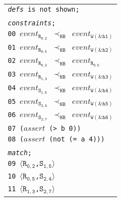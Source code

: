 \newsavebox{\boxSMTb}
\begin{lrbox}{\boxSMTb}
\normalsize
\begin{tabular}[c]{l}
\texttt{\textit{defs} is not shown;}\\
\\
\texttt{\textit{constraints};}\\
\texttt{00 $\mathit{event_\mathtt{R_{0,2}}}$ $\mathtt{\prec_\mathtt{HB}}$ $\mathit{event_\mathtt{W(\&h1)}}$}\\
\texttt{01 $\mathit{event_\mathtt{R_{0,5}}}$ $\mathtt{\prec_\mathtt{HB}}$ $\mathit{event_\mathtt{W(\&h2)}}$}\\
\texttt{02 $\mathit{event_\mathtt{R_{0,2}}}$ $\mathtt{\prec_\mathtt{HB}}$ $\mathit{event_\mathtt{R_{0,5}}}$}\\
\texttt{03 $\mathit{event_\mathtt{R_{1,3}}}$ $\mathtt{\prec_\mathtt{HB}}$ $\mathit{event_\mathtt{W(\&h3)}}$}\\
\texttt{04 $\mathit{event_\mathtt{S_{1,5}}}$ $\mathtt{\prec_\mathtt{HB}}$ $\mathit{event_\mathtt{W(\&h4)}}$}\\
\texttt{05 $\mathit{event_\mathtt{S_{2,4}}}$ $\mathtt{\prec_\mathtt{HB}}$ $\mathit{event_\mathtt{W(\&h5)}}$}\\
\texttt{06 $\mathit{event_\mathtt{S_{2,7}}}$ $\mathtt{\prec_\mathtt{HB}}$ $\mathit{event_\mathtt{W(\&h6)}}$}\\
\texttt{07 ($\mathit{assert}$ (> b 0))}\\
\texttt{08 ($\mathit{assert}$ (not (= a 4)))}\\
\\
\texttt{\textit{match};}\\
\texttt{09 $\langle\mathtt{R_{0,2}}$,$\mathtt{S_{1,5}}\rangle$}\\
\texttt{10 $\langle\mathtt{R_{0,5}}$,$\mathtt{S_{2,4}}\rangle$}\\
\texttt{11 $\langle\mathtt{R_{1,3}}$,$\mathtt{S_{2,7}}\rangle$}\\

\end{tabular}
\end{lrbox}

